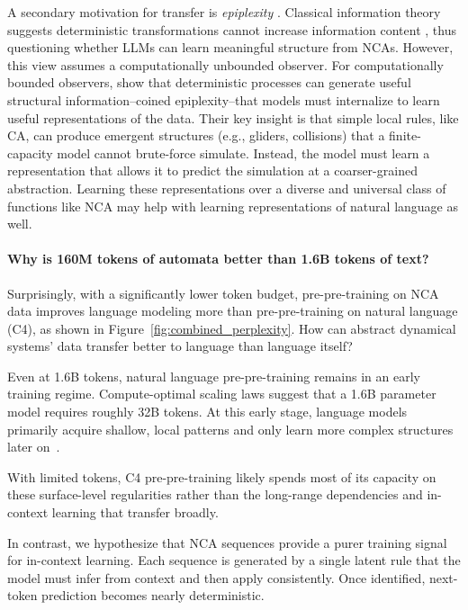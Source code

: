 \documentclass{article}
\theoremstyle{plain}
\theoremstyle{definition}
\theoremstyle{remark}
\begin{document}
A secondary motivation for transfer is \textit{epiplexity} \citep{finzi2026entropy}. Classical information theory suggests deterministic transformations cannot increase information content \citep{Polyanskiy_Wu_2025}, thus questioning whether LLMs can learn meaningful structure from NCAs.
However, this view assumes a computationally unbounded observer. For computationally bounded observers, \citet{finzi2026entropy} show that deterministic processes can generate useful structural information--coined epiplexity--that models must internalize to learn useful representations of the data.
Their key insight is that simple local rules, like CA, can produce emergent structures (e.g., gliders, collisions) that a finite-capacity model cannot brute-force simulate. Instead, the model must learn a representation that allows it to predict the simulation at a coarser-grained abstraction. Learning these representations over a diverse and universal class of functions like NCA may help with learning representations of natural language as well.


\paragraph{Why is 160M tokens of automata better than 1.6B tokens of text?}

Surprisingly, with a significantly lower token budget, pre-pre-training on NCA data improves language modeling more than pre-pre-training on natural language (C4), as shown in Figure~\ref{fig:combined_perplexity}.
How can abstract dynamical systems' data transfer better to language than language itself?


Even at 1.6B tokens, natural language pre-pre-training remains in an early training regime. Compute-optimal scaling laws suggest \citep{hoffmann2022trainingcomputeoptimallargelanguage} that a 1.6B parameter model requires roughly 32B tokens.
At this early stage, language models primarily acquire shallow, local patterns and only learn more complex structures later on~\citep{evanson2023language,chen2023sudden}.

With limited tokens, C4 pre-pre-training likely spends most of its capacity on these surface-level regularities rather than the long-range dependencies and in-context learning that transfer broadly.

In contrast, we hypothesize that NCA sequences provide a purer training signal for in-context learning. Each sequence is generated by a single latent rule that the model must infer from context and then apply consistently. Once identified, next-token prediction becomes nearly deterministic. 
\end{document}
